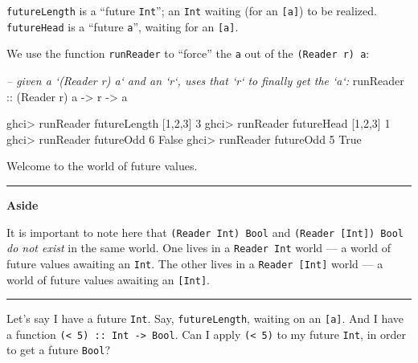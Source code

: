 \documentclass[]{article}
\newenvironment{Shaded}{\begin{snugshade}}{\end{snugshade}}
\newcommand{\CommentTok}[1]{\textcolor[rgb]{0.56,0.35,0.01}{\textit{#1}}}
\newcommand{\DataTypeTok}[1]{\textcolor[rgb]{0.13,0.29,0.53}{#1}}
\newcommand{\DecValTok}[1]{\textcolor[rgb]{0.00,0.00,0.81}{#1}}
\newcommand{\FunctionTok}[1]{\textcolor[rgb]{0.00,0.00,0.00}{#1}}
\newcommand{\NormalTok}[1]{#1}
\newcommand{\OtherTok}[1]{\textcolor[rgb]{0.56,0.35,0.01}{#1}}
\begin{document}
\texttt{futureLength} is a ``future \texttt{Int}''; an \texttt{Int} waiting (for
an \texttt{{[}a{]}}) to be realized. \texttt{futureHead} is a ``future
\texttt{a}'', waiting for an \texttt{{[}a{]}}.

We use the function \texttt{runReader} to ``force'' the \texttt{a} out of the
\texttt{(Reader\ r)\ a}:

\begin{Shaded}
\begin{Highlighting}[]
\CommentTok{-- given a `(Reader r) a` and an `r`, uses that `r` to finally get the `a`:}
\OtherTok{runReader ::}\NormalTok{ (}\DataTypeTok{Reader}\NormalTok{ r) a }\OtherTok{->}\NormalTok{ r }\OtherTok{->}\NormalTok{ a}
\end{Highlighting}
\end{Shaded}

\begin{Shaded}
\begin{Highlighting}[]
\NormalTok{ghci}\FunctionTok{>}\NormalTok{ runReader futureLength [}\DecValTok{1}\NormalTok{,}\DecValTok{2}\NormalTok{,}\DecValTok{3}\NormalTok{]}
\DecValTok{3}
\NormalTok{ghci}\FunctionTok{>}\NormalTok{ runReader futureHead [}\DecValTok{1}\NormalTok{,}\DecValTok{2}\NormalTok{,}\DecValTok{3}\NormalTok{]}
\DecValTok{1}
\NormalTok{ghci}\FunctionTok{>}\NormalTok{ runReader futureOdd }\DecValTok{6}
\DataTypeTok{False}
\NormalTok{ghci}\FunctionTok{>}\NormalTok{ runReader futureOdd }\DecValTok{5}
\DataTypeTok{True}
\end{Highlighting}
\end{Shaded}

Welcome to the world of future values.

\begin{center}\rule{0.5\linewidth}{\linethickness}\end{center}

\textbf{Aside}

It is important to note here that \texttt{(Reader\ Int)\ Bool} and
\texttt{(Reader\ {[}Int{]})\ Bool} \emph{do not exist} in the same world. One
lives in a \texttt{Reader\ Int} world --- a world of future values awaiting an
\texttt{Int}. The other lives in a \texttt{Reader\ {[}Int{]}} world --- a world
of future values awaiting an \texttt{{[}Int{]}}.

\begin{center}\rule{0.5\linewidth}{\linethickness}\end{center}

Let's say I have a future \texttt{Int}. Say, \texttt{futureLength}, waiting on
an \texttt{{[}a{]}}. And I have a function
\texttt{(\textless{}\ 5)\ ::\ Int\ -\textgreater{}\ Bool}. Can I apply
\texttt{(\textless{}\ 5)} to my future \texttt{Int}, in order to get a future
\texttt{Bool}?
\end{document}
